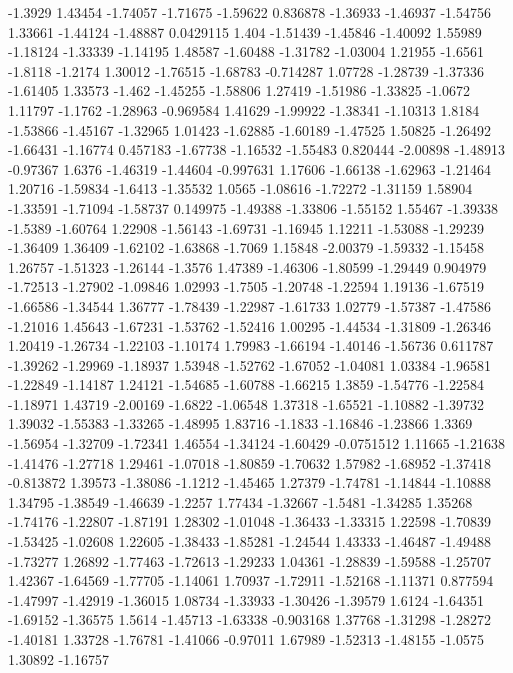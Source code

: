 \documentclass[9pt]{article}
\theoremstyle{plain}
\theoremstyle{definition}
\theoremstyle{remark}
\numberwithin{equation}{section}
\begin{document}
-1.3929
1.43454
-1.74057
-1.71675
-1.59622
0.836878
-1.36933
-1.46937
-1.54756
1.33661
-1.44124
-1.48887
0.0429115
1.404
-1.51439
-1.45846
-1.40092
1.55989
-1.18124
-1.33339
-1.14195
1.48587
-1.60488
-1.31782
-1.03004
1.21955
-1.6561
-1.8118
-1.2174
1.30012
-1.76515
-1.68783
-0.714287
1.07728
-1.28739
-1.37336
-1.61405
1.33573
-1.462
-1.45255
-1.58806
1.27419
-1.51986
-1.33825
-1.0672
1.11797
-1.1762
-1.28963
-0.969584
1.41629
-1.99922
-1.38341
-1.10313
1.8184
-1.53866
-1.45167
-1.32965
1.01423
-1.62885
-1.60189
-1.47525
1.50825
-1.26492
-1.66431
-1.16774
0.457183
-1.67738
-1.16532
-1.55483
0.820444
-2.00898
-1.48913
-0.97367
1.6376
-1.46319
-1.44604
-0.997631
1.17606
-1.66138
-1.62963
-1.21464
1.20716
-1.59834
-1.6413
-1.35532
1.0565
-1.08616
-1.72272
-1.31159
1.58904
-1.33591
-1.71094
-1.58737
0.149975
-1.49388
-1.33806
-1.55152
1.55467
-1.39338
-1.5389
-1.60764
1.22908
-1.56143
-1.69731
-1.16945
1.12211
-1.53088
-1.29239
-1.36409
1.36409
-1.62102
-1.63868
-1.7069
1.15848
-2.00379
-1.59332
-1.15458
1.26757
-1.51323
-1.26144
-1.3576
1.47389
-1.46306
-1.80599
-1.29449
0.904979
-1.72513
-1.27902
-1.09846
1.02993
-1.7505
-1.20748
-1.22594
1.19136
-1.67519
-1.66586
-1.34544
1.36777
-1.78439
-1.22987
-1.61733
1.02779
-1.57387
-1.47586
-1.21016
1.45643
-1.67231
-1.53762
-1.52416
1.00295
-1.44534
-1.31809
-1.26346
1.20419
-1.26734
-1.22103
-1.10174
1.79983
-1.66194
-1.40146
-1.56736
0.611787
-1.39262
-1.29969
-1.18937
1.53948
-1.52762
-1.67052
-1.04081
1.03384
-1.96581
-1.22849
-1.14187
1.24121
-1.54685
-1.60788
-1.66215
1.3859
-1.54776
-1.22584
-1.18971
1.43719
-2.00169
-1.6822
-1.06548
1.37318
-1.65521
-1.10882
-1.39732
1.39032
-1.55383
-1.33265
-1.48995
1.83716
-1.1833
-1.16846
-1.23866
1.3369
-1.56954
-1.32709
-1.72341
1.46554
-1.34124
-1.60429
-0.0751512
1.11665
-1.21638
-1.41476
-1.27718
1.29461
-1.07018
-1.80859
-1.70632
1.57982
-1.68952
-1.37418
-0.813872
1.39573
-1.38086
-1.1212
-1.45465
1.27379
-1.74781
-1.14844
-1.10888
1.34795
-1.38549
-1.46639
-1.2257
1.77434
-1.32667
-1.5481
-1.34285
1.35268
-1.74176
-1.22807
-1.87191
1.28302
-1.01048
-1.36433
-1.33315
1.22598
-1.70839
-1.53425
-1.02608
1.22605
-1.38433
-1.85281
-1.24544
1.43333
-1.46487
-1.49488
-1.73277
1.26892
-1.77463
-1.72613
-1.29233
1.04361
-1.28839
-1.59588
-1.25707
1.42367
-1.64569
-1.77705
-1.14061
1.70937
-1.72911
-1.52168
-1.11371
0.877594
-1.47997
-1.42919
-1.36015
1.08734
-1.33933
-1.30426
-1.39579
1.6124
-1.64351
-1.69152
-1.36575
1.5614
-1.45713
-1.63338
-0.903168
1.37768
-1.31298
-1.28272
-1.40181
1.33728
-1.76781
-1.41066
-0.97011
1.67989
-1.52313
-1.48155
-1.0575
1.30892
-1.16757
\end{document}

